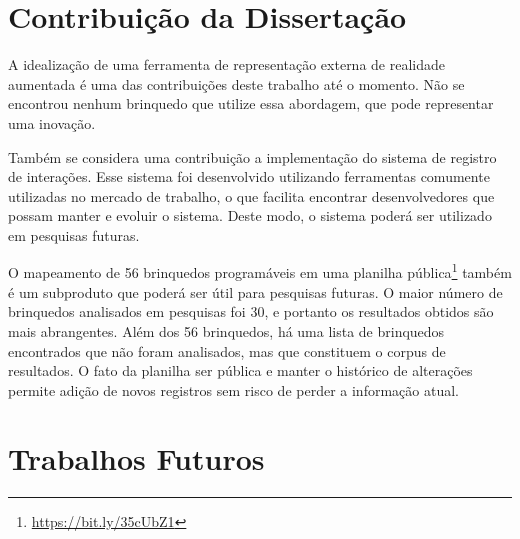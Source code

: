 \section{Contribuição da Dissertação}
\label{c_conclusao-contribuicao}


A idealização de uma ferramenta de representação externa de realidade aumentada é uma das contribuições deste trabalho até o momento. Não se encontrou nenhum brinquedo que utilize essa abordagem, que pode representar uma inovação.

Também se considera uma contribuição a implementação do sistema de registro de interações. Esse sistema foi desenvolvido utilizando ferramentas comumente utilizadas no mercado de trabalho, o que facilita encontrar desenvolvedores que possam manter e evoluir o sistema. Deste modo, o sistema poderá ser utilizado em pesquisas futuras.

O mapeamento de 56 brinquedos programáveis em uma planilha pública\footnote{\url{https://bit.ly/35cUbZ1}} também é um subproduto que poderá ser útil para pesquisas futuras. O maior número de brinquedos analisados em pesquisas \cite{hamilton_emerging_2020,yu_review_2019} foi 30, e portanto os resultados obtidos são mais abrangentes. Além dos 56 brinquedos, há uma lista de brinquedos encontrados que não foram analisados, mas que constituem o corpus de resultados. O fato da planilha ser pública e manter o histórico de alterações permite adição de novos registros sem risco de perder a informação atual.

\section{Trabalhos Futuros}
\label{c_conclusao-trabalhos-futuros}


